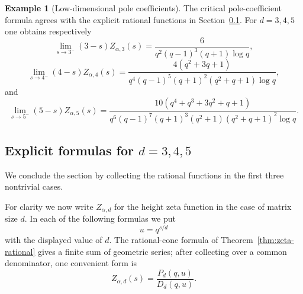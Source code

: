 \documentclass[11pt]{amsart}
\theoremstyle{plain}
\theoremstyle{definition}
\newtheorem{example}[theorem]{Example}
\numberwithin{equation}{section}
\begin{document}
\begin{example}[Low-dimensional pole coefficients]\label{ex:low-dimensional-pole-coefficients}
The critical pole-coefficient formula agrees with the explicit rational functions in
Section~\ref{sec:low-rank-zeta}.  For $d=3,4,5$ one obtains respectively
\[
  \lim_{s\to3^-}(3-s)Z_{\alpha,3}(s)
  =\frac{6}{q^2(q-1)^3(q+1)\log q},
\]
\[
  \lim_{s\to4^-}(4-s)Z_{\alpha,4}(s)
  =\frac{4(q^2+3q+1)}
  {q^4(q-1)^5(q+1)^2(q^2+q+1)\log q},
\]
and
\[
  \lim_{s\to5^-}(5-s)Z_{\alpha,5}(s)
  =\frac{10(q^4+q^3+3q^2+q+1)}
  {q^6(q-1)^7(q+1)^3(q^2+1)(q^2+q+1)^2\log q}.
\]
\end{example}

\subsection{Explicit formulas for \(d=3,4,5\)}\label{sec:low-rank-zeta}

We conclude the section by collecting the rational functions in the first three
nontrivial cases.

For clarity we now write $Z_{\alpha,d}$ for the height zeta function in the
case of matrix size \(d\).  In each
of the following formulas we put
\[
  u=q^{s/d}
\]
with the displayed value of $d$.  The rational-cone formula of
Theorem~\ref{thm:zeta-rational} gives a finite sum of geometric series; after collecting over a
common denominator, one convenient form is
\[
  Z_{\alpha,d}(s)=\frac{P_d(q,u)}{D_d(q,u)}.
\]
\end{document}
